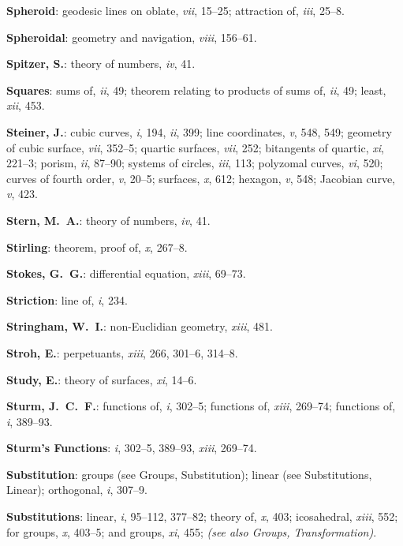 \documentclass[11pt,a4paper]{article}
\newcommand{\IndexEntry}[1]{\textbf{#1}}
\newcommand{\SeeAlso}[1]{\textit{(see also #1)}}
\newcommand{\V}[1]{\textit{#1}} %
\begin{document}
\IndexEntry{Spheroid}: geodesic lines on oblate, \V{vii}, 15--25; attraction of, \V{iii}, 25--8.

\IndexEntry{Spheroidal}: geometry and navigation, \V{viii}, 156--61.

\IndexEntry{Spitzer, S.}: theory of numbers, \V{iv}, 41.

\IndexEntry{Squares}: sums of, \V{ii}, 49; theorem relating to products of sums of, \V{ii}, 49; least, \V{xii}, 453.

\IndexEntry{Steiner, J.}: cubic curves, \V{i}, 194, \V{ii}, 399; line coordinates, \V{v}, 548, 549; geometry of cubic surface, \V{vii}, 352--5; quartic surfaces, \V{vii}, 252; bitangents of quartic, \V{xi}, 221--3; porism, \V{ii}, 87--90; systems of circles, \V{iii}, 113; polyzomal curves, \V{vi}, 520; curves of fourth order, \V{v}, 20--5; surfaces, \V{x}, 612; hexagon, \V{v}, 548; Jacobian curve, \V{v}, 423.

\IndexEntry{Stern, M.\ A.}: theory of numbers, \V{iv}, 41.

\IndexEntry{Stirling}: theorem, proof of, \V{x}, 267--8.

\IndexEntry{Stokes, G.\ G.}: differential equation, \V{xiii}, 69--73.

\IndexEntry{Striction}: line of, \V{i}, 234.

\IndexEntry{Stringham, W.\ I.}: non-Euclidian geometry, \V{xiii}, 481.

\IndexEntry{Stroh, E.}: perpetuants, \V{xiii}, 266, 301--6, 314--8.

\IndexEntry{Study, E.}: theory of surfaces, \V{xi}, 14--6.

\IndexEntry{Sturm, J.\ C.\ F.}: functions of, \V{i}, 302--5; functions of, \V{xiii}, 269--74; functions of, \V{i}, 389--93.

\IndexEntry{Sturm's Functions}: \V{i}, 302--5, 389--93, \V{xiii}, 269--74.

\IndexEntry{Substitution}: groups (see Groups, Substitution); linear (see Substitutions, Linear); orthogonal, \V{i}, 307--9.

\newpage

\setcounter{page}{125}

\IndexEntry{Substitutions}: linear, \V{i}, 95--112, 377--82; theory of, \V{x}, 403; icosahedral, \V{xiii}, 552; for groups, \V{x}, 403--5; and groups, \V{xi}, 455; \SeeAlso{Groups, Transformation}.
\end{document}
